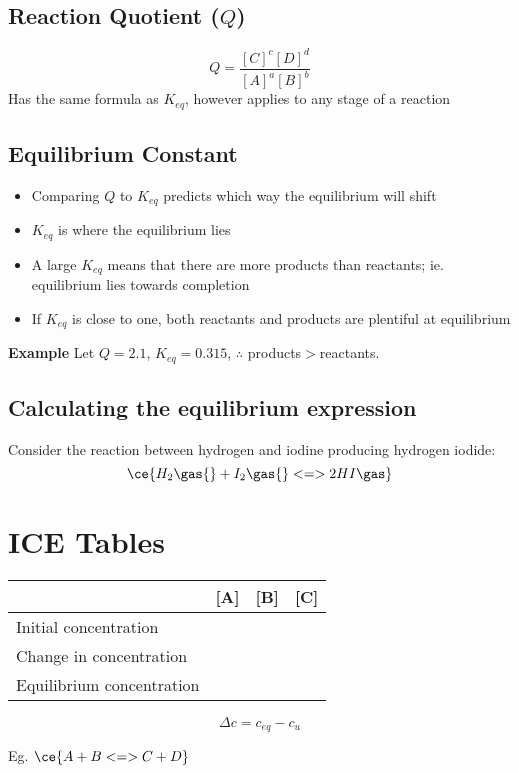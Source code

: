 	\subsection{Reaction Quotient ($Q$)}
		$$Q=\frac{[C]^{c}[D]^{d}}{[A]^a[B]^b}$$
		Has the same formula as $K_{eq}$, however applies to any stage of a reaction
		
	\subsection{Equilibrium Constant}
		\begin{itemize}
			\item Comparing $Q$ to $K_{eq}$ predicts which way the equilibrium will shift
			\item $K_{eq}$ is where the equilibrium lies
			\item A large $K_{eq}$ means that there are more products than reactants; ie. equilibrium lies towards completion
			\item If $K_{eq}$ is close to one, both reactants and products are plentiful at equilibrium
		\end{itemize}
		\textbf{Example} Let $Q=2.1$, $K_{eq}=0.315$, $\therefore$ products$>$reactants.

	\subsection{Calculating the equilibrium expression}
		Consider the reaction between hydrogen and iodine producing hydrogen iodide:
		$$\ce{H_{2}\gas{} + I_{2}\gas{} <=> 2HI\gas}$$

\section{ICE Tables} \label{6/11/2024}
	\begin{table}[htbp]
		\centering
		\begin{tabular}{|l|l|l|l|}
			\hline
			 & [A] & [B] & [C] \\ \hline
			Initial concentration &  &  &  \\
			Change in concentration &  &  &  \\
			Equilibrium concentration &  &  &  \\ \hline
		\end{tabular}
	\end{table}

	$$\Delta c = c_{eq}- c_{u}$$

	Eg. $\ce{A + B <=> C + D}$


